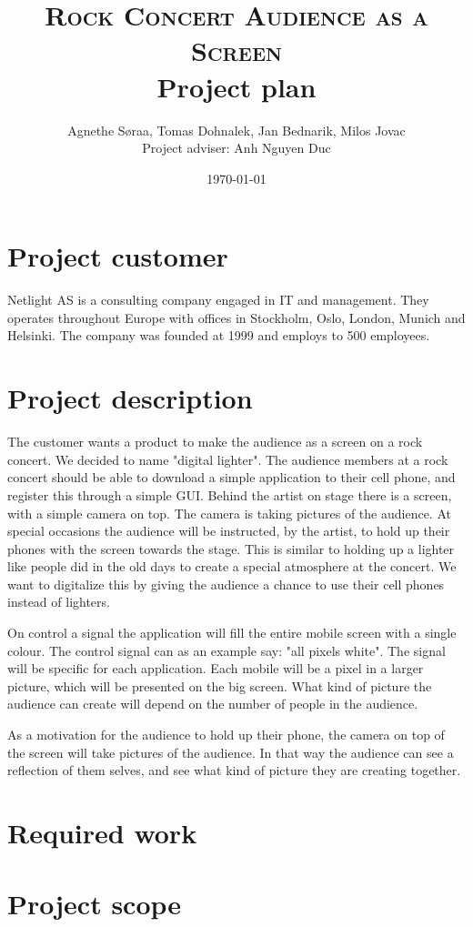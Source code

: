 \documentclass{article}
\title{
    \normalsize \textsc{Rock Concert Audience as a Screen}\\
    \Huge Project plan}
\author{Agnethe Søraa,
Tomas Dohnalek,
Jan Bednarik,
Milos Jovac \\
\normalsize Project adviser: Anh Nguyen Duc}
\date{\today}
\begin{document}
\maketitle
\section{Project customer}
Netlight AS is a consulting company engaged in IT and management. They operates throughout Europe with offices in Stockholm, Oslo, London, Munich and Helsinki. The company was founded at 1999 and employs to 500 employees.

\section{Project description}

The customer wants a product to make the audience as a screen on a rock concert. We decided to name "digital lighter". 
The audience members at a rock concert should be able to download a simple application to their cell phone, and register this through a simple GUI.
Behind the artist on stage there is a screen, with a simple camera on top. The camera is taking pictures of the audience. 
At special occasions the audience will be instructed, by the artist, to hold up their phones with the screen towards the stage.
This is similar to holding up a lighter like people did in the old days to create a special atmosphere at the concert. 
We want to digitalize this by giving the audience a chance to use their cell phones instead of lighters. 

On control a signal the application will fill the entire mobile screen with a single colour.
The control signal can as an example say: "all pixels white". The signal will be specific for each application.
Each mobile will be a pixel in a larger picture, which will be presented on the big screen. 
What kind of picture the audience can create will depend on the number of people in the audience.   

As a motivation for the audience to hold up their phone, the camera on top of the screen will take pictures of the audience.
In that way the audience can see a reflection of them selves, and see what kind of picture they are creating together.  


\section{Required work}
\section{Project scope}
\end{document}
